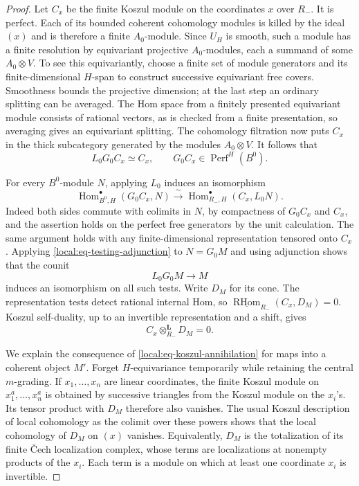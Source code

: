 \documentclass[11pt]{article}
\numberwithin{equation}{section}
\theoremstyle{definition}
\theoremstyle{remark}
\newcommand{\Hom}{\operatorname{Hom}}
\newcommand{\RHom}{\operatorname{RHom}}
\newcommand{\Perf}{\operatorname{Perf}}
\begin{document}
\begin{proof}
Let $C_x$ be the finite Koszul module on the coordinates $x$ over
$R_-$.  It is perfect.  Each of its bounded coherent cohomology
modules is killed by the ideal $(x)$ and is therefore a finite
$A_0$-module.  Since $U_H$ is smooth, such a module has a finite
resolution by equivariant projective $A_0$-modules, each a summand
of some $A_0\otimes V$.  To see this equivariantly, choose a finite
set of module generators and its finite-dimensional $H$-span to
construct successive equivariant free covers.  Smoothness bounds the
projective dimension; at the last step an ordinary splitting can be
averaged.  The Hom space from a finitely presented equivariant
module consists of rational vectors, as is checked from a finite
presentation, so averaging gives an equivariant splitting.
The cohomology filtration now puts $C_x$ in the thick subcategory
generated by the modules $A_0\otimes V$.  It follows that
\begin{equation}\label{local:eq-koszul-compact-reconstruction}
 L_0G_0C_x\simeq C_x,
 \qquad G_0C_x\in\Perf^H(B^0).
\end{equation}

For every $B^0$-module $N$, applying $L_0$ induces an isomorphism
\begin{equation}\label{local:eq-testing-adjunction}
 \Hom^\bullet_{B^0,H}(G_0C_x,N)
 \xrightarrow{\ \sim\ }
 \Hom^\bullet_{R_-,H}(C_x,L_0N).
\end{equation}
Indeed both sides commute with colimits in $N$, by compactness of
$G_0C_x$ and $C_x$, and the assertion holds on the perfect free
generators by the unit calculation.  The same argument holds with
any finite-dimensional representation tensored onto $C_x$.
Applying \eqref{local:eq-testing-adjunction} to $N=G_0M$ and using
adjunction shows that the counit
\begin{equation}\label{local:eq-counit}
 L_0G_0M\longrightarrow M
\end{equation}
induces an isomorphism on all such tests.  Write $D_M$ for its cone.
The representation tests detect rational internal Hom, so
$\underline{\RHom}_{R_-}(C_x,D_M)=0$.  Koszul self-duality,
up to an invertible representation and a shift, gives
\begin{equation}\label{local:eq-koszul-annihilation}
 C_x\otimes_{R_-}^{\mathbf L}D_M=0.
\end{equation}

We explain the consequence of
\eqref{local:eq-koszul-annihilation} for maps into a coherent object
$M'$.  Forget $H$-equivariance temporarily while retaining the
central $m$-grading.  If $x_1,\ldots,x_n$ are linear coordinates,
the finite Koszul module on $x_1^a,\ldots,x_n^a$ is obtained by
successive triangles from the Koszul module on the $x_i$'s.  Its
tensor product with $D_M$ therefore also vanishes.  The usual
Koszul description of local cohomology as the colimit over these
powers shows that the local cohomology of $D_M$ on $(x)$ vanishes.
Equivalently, $D_M$ is the totalization of its finite \v Cech
localization complex, whose terms are localizations at nonempty
products of the $x_i$.  Each term is a module on which at least
one coordinate $x_i$ is invertible.


\end{proof}
\end{document}
